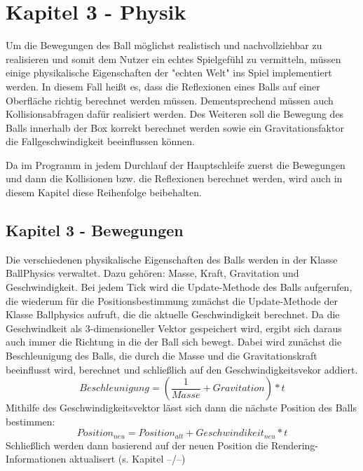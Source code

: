 \chapter{Kapitel 3 - Physik}
\label{Kapitel 4}

Um die Bewegungen des Ball möglichst realistisch und nachvollziehbar zu realisieren und somit dem Nutzer ein echtes Spielgefühl zu vermitteln, müssen einige physikalische Eigenschaften der "{}echten Welt"{} ins Spiel implementiert werden. In diesem Fall heißt es, dass die Reflexionen eines Balls auf einer Oberfläche richtig berechnet werden müssen. Dementsprechend müssen auch Kollisionsabfragen dafür realisiert werden. Des Weiteren soll die Bewegung des Balls innerhalb der Box korrekt berechnet werden sowie ein Gravitationsfaktor die Fallgeschwindigkeit beeinflussen können.

Da im Programm in jedem Durchlauf der Hauptschleife zuerst die Bewegungen und dann die Kollisionen bzw. die Reflexionen berechnet werden, wird auch in diesem Kapitel diese Reihenfolge beibehalten.
\section{Kapitel 3 - Bewegungen}
\label{Kapitel_4_-_Unterkapitel_1}
Die verschiedenen physikalische Eigenschaften des Balls werden in der Klasse BallPhysics verwaltet. Dazu gehören: Masse, Kraft, Gravitation und Geschwindigkeit.
Bei jedem Tick wird die Update-Methode des Balls aufgerufen, die wiederum für die Positionsbestimmung zunächst die Update-Methode der Klasse Ballphysics aufruft, die die aktuelle Geschwindigkeit berechnet. Da die Geschwindkeit als 3-dimensioneller Vektor gespeichert wird, ergibt sich daraus auch immer die Richtung in die der Ball sich bewegt. Dabei wird zunächst die Beschleunigung des Balls, die durch die Masse und die Gravitationskraft beeinflusst wird, berechnet und schließlich auf den Geschwindigkeitsvekor addiert.
 \begin{equation}
	    \label{beschleunigung}
	    Beschleunigung = (\frac{1}{Masse} + Gravitation) * t 
    \end{equation}
Mithilfe des Geschwindigkeitsvektor lässt sich dann die nächste Position des Balls bestimmen:
\begin{equation}
	    \label{beschleunigung}
	    Position_{neu} = Position_{alt} + Geschwindikeit_{neu} * t 
    \end{equation}
Schließlich werden dann basierend auf der neuen Position die Rendering-Informationen aktualisert (s. Kapitel --/--) 



